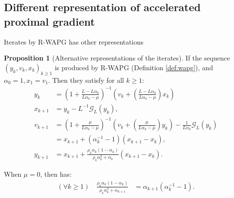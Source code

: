 \documentclass[11pt]{beamer}
\theoremstyle{definition}
\newtheorem{proposition}{Proposition}[section]
\begin{document}
    \subsection{Different representation of accelerated proximal gradient}
        \begin{frame}{Iterates by R-WAPG has other representations}
            \begin{proposition}[Alternative representations of the iterates]\label{prop:wapg-first-equivalent-repr}
                If the sequence $(y_k, v_k, x_k)_{k \ge 1}$ is produced by R-WAPG (Definition \ref{def:wapg}), and $\alpha_0 = 1, x_1 = v_1$. 
                Then they satisfy for all $k\ge 1$: 
                {\footnotesize
                \begin{align}
                    y_{k} &=
                    \left(
                        1 + \frac{L - L\alpha_{k}}{L\alpha_{k} - \mu}
                    \right)^{-1}
                    \left(
                        v_{k} +
                        \left(\frac{L - L\alpha_{k}}{L\alpha_{k} - \mu} \right) x_{k}
                    \right)
                    \\
                    x_{k + 1} 
                    &=y_k - L^{-1} \mathcal G_L (y_k),
                    \\
                    v_{k + 1} 
                    &=
                    \left(
                        1 + \frac{\mu}{L \alpha_k - \mu}
                    \right)^{-1}
                    \left(
                        v_k +
                        \left(\frac{\mu}{L \alpha_k - \mu}\right) y_k
                    \right) - \frac{1}{L\alpha_{k}}\mathcal G_L (y_k)
                    \\
                    &= 
                    x_{k + 1} + (\alpha_k^{-1} - 1)(x_{k + 1} - x_k), 
                    \\
                    y_{k + 1}
                    &= x_{k + 1} +
                    \frac{\rho_{k}\alpha_{k}(1 - \alpha_k)}
                    {\rho_k\alpha_k^2 + \alpha_k}(x_{k + 1} - x_k). 
                \end{align}
                }
            \end{proposition}
            When $\mu = 0$, then has:
            {\small
            \begin{align*}
                (\forall k \ge 1) \quad
                \frac{\rho_k\alpha_k(1 - \alpha_k)}{\rho_k\alpha_k^2 + \alpha_{k + 1}}
                & = \alpha_{k + 1}(\alpha_k^{-1} - 1).
            \end{align*}
            }
        \end{frame}
\end{document}
